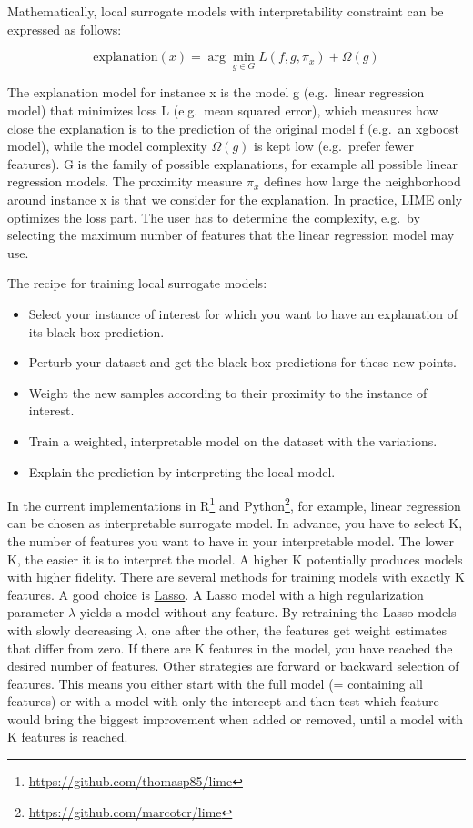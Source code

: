 \documentclass[
  10pt,
]{scrbook}
\providecommand{\tightlist}{%
  \setlength{\itemsep}{0pt}\setlength{\parskip}{0pt}}
\renewcommand{\href}[2]{#2\footnote{\url{#1}}}
\begin{document}
Mathematically, local surrogate models with interpretability constraint can be expressed as follows:

\[\text{explanation}(x)=\arg\min_{g\in{}G}L(f,g,\pi_x)+\Omega(g)\]

The explanation model for instance x is the model g (e.g.~linear regression model) that minimizes loss L (e.g.~mean squared error), which measures how close the explanation is to the prediction of the original model f (e.g.~an xgboost model), while the model complexity \(\Omega(g)\) is kept low (e.g.~prefer fewer features).
G is the family of possible explanations, for example all possible linear regression models.
The proximity measure \(\pi_x\) defines how large the neighborhood around instance x is that we consider for the explanation.
In practice, LIME only optimizes the loss part.
The user has to determine the complexity, e.g.~by selecting the maximum number of features that the linear regression model may use.

The recipe for training local surrogate models:

\begin{itemize}
\tightlist
\item
  Select your instance of interest for which you want to have an explanation of its black box prediction.
\item
  Perturb your dataset and get the black box predictions for these new points.
\item
  Weight the new samples according to their proximity to the instance of interest.
\item
  Train a weighted, interpretable model on the dataset with the variations.
\item
  Explain the prediction by interpreting the local model.
\end{itemize}

In the current implementations in \href{https://github.com/thomasp85/lime}{R} and \href{https://github.com/marcotcr/lime}{Python}, for example, linear regression can be chosen as interpretable surrogate model.
In advance, you have to select K, the number of features you want to have in your interpretable model.
The lower K, the easier it is to interpret the model.
A higher K potentially produces models with higher fidelity.
There are several methods for training models with exactly K features.
A good choice is \protect\hyperlink{lasso}{Lasso}.
A Lasso model with a high regularization parameter \(\lambda\) yields a model without any feature.
By retraining the Lasso models with slowly decreasing \(\lambda\), one after the other, the features get weight estimates that differ from zero.
If there are K features in the model, you have reached the desired number of features.
Other strategies are forward or backward selection of features.
This means you either start with the full model (= containing all features) or with a model with only the intercept and then test which feature would bring the biggest improvement when added or removed, until a model with K features is reached.
\end{document}
